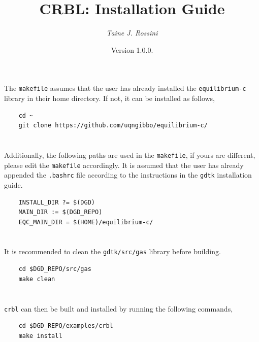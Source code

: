 \documentclass[10pt,a4paper]{article}
\title{CRBL: Installation Guide}
\author{\textit{Taine J. Rossini}}
\date{Version 1.0.0.}
\begin{document}
\maketitle

\section{}

The \texttt{makefile} assumes that the user has already installed the \texttt{equilibrium-c} library in their home directory. If not, it can be installed as follows,

\begin{verbatim}
    cd ~
    git clone https://github.com/uqngibbo/equilibrium-c/
\end{verbatim}

\section{}

Additionally, the following paths are used in the \texttt{makefile}, if yours are different, please edit the \texttt{makefile} accordingly. It is assumed that the user has already appended the \texttt{.bashrc} file according to the instructions in the \texttt{gdtk} installation guide.

\begin{verbatim}
    INSTALL_DIR ?= $(DGD)
    MAIN_DIR := $(DGD_REPO)
    EQC_MAIN_DIR = $(HOME)/equilibrium-c/
\end{verbatim}

\section{}

It is recommended to clean the \texttt{gdtk/src/gas} library before building.

\begin{verbatim}
    cd $DGD_REPO/src/gas
    make clean
\end{verbatim}

\section{}

\texttt{crbl} can then be built and installed by running the following commands,

\begin{verbatim}
    cd $DGD_REPO/examples/crbl
    make install
\end{verbatim}
\end{document}
